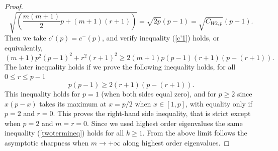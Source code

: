 \documentclass[11pt,a4paper,times]{amsart}
\theoremstyle{plain}
\theoremstyle{definition}
\numberwithin{equation}{section}
\newcommand{\Cwnp}[2]{ C_{W #1,#2}}
\begin{document}
{\begin{proof}
\[{\sqrt{\left(\frac{m(m+1)}{2}p+ (m+1)(r+1)\right)}}= \sqrt{2p}(p-1)= \sqrt{\Cwnp{2}{p}}(p-1).
\]
Then we take $c'(p)=c^-(p)$, and verify  inequality (\ref{c'1}) holds, or equivalently,
\begin{equation*}
(m+1)p^2(p-1)^2+r^2(r+1)^2 \geq 2(m+1)p(p-1)(r+1)(p-(r+1)).
\end{equation*}
The later inequality holds if we prove the following  inequality holds, for all $0\leq r\leq p-1$
\begin{equation*}
p(p-1)\geq 2(r+1)(p-(r+1)).
\end{equation*}
This inequality holds for $p=1$ (when both sides equal zero), and for $p\geq 2$ since $x(p-x)$ takes its maximum at $x= p/2$ when  $x\in [1,p]$, with equality only if $p=2$ and $r=0$.
This proves the right-hand side inequality, that is strict except when $p=2$ and  $m=r=0$. {Since we used highest order eigenvalues the same inequality (\ref{twotermineq}) holds for all $k\geq 1$.  From the  above limit} follows the asymptotic sharpness when $m\to +\infty$ along highest order eigenvalues.


\end{proof}}
\end{document}
